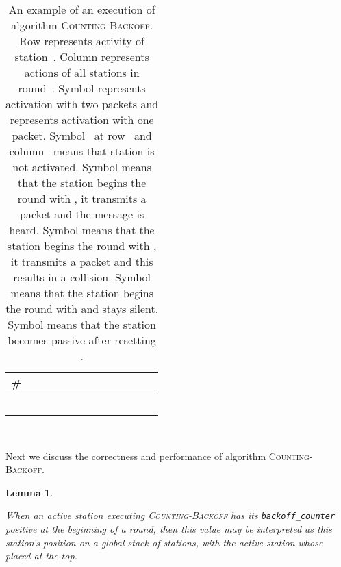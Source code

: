 \documentclass[11pt]{article}
\newlength{\pagewidth}
\newcommand{\RB}{\raisebox{2.5ex}{~}}
\newcommand{\LB}{\raisebox{-1.5ex}{~}}
\newtheorem{lemma}{Lemma}
\begin{document}
\begin{table}[t]
\begin{center}
\begin{tabular}{| c ||c |c |c |c |c | c | c | c | c | c | c | c | }
\hline
\RB \LB
\# &  &  &  &&&  & & &  &  &  &  \\
\hline\hline
\RB \LB
&   &  &  & & && & &  &&&\\
\hline
\RB \LB
 & &  &  && & & && &&&\\
\hline
\RB \LB
 & & & & & & &&& &&&\\
\hline
\RB \LB
 & & &&  & &&&& &&&\\
\hline
\RB \LB
 & & &&& &&&& &&&\\
\hline
\end{tabular}
\parbox{\pagewidth}{
~
\caption{\label{tab:first-example-counting-backoff}
An example of an execution of algorithm \textsc{Counting-Backoff}.
Row  represents activity of station~.
Column  represents actions of all stations in round~.
Symbol  represents activation with two packets and  represents activation with one packet.
Symbol~ at row~  and column~ means that station  is not activated.
Symbol  means that the station begins the round with , it  transmits a packet and the message is heard.
Symbol  means that the station begins the round with , it  transmits a packet and this results in a collision.
Symbol  means that the station begins the round with  and stays silent.
Symbol  means that the station becomes passive after resetting .
}}
\end{center}
\end{table}





Next we discuss the correctness and performance of algorithm  \textsc{Counting-Backoff}.



\begin{lemma}
\label{lem:stack}

When an active station executing \textsc{Counting-Backoff} has its \emph{\texttt{backoff\_counter}} positive at the beginning of a round, then this value may be interpreted as  this station's position on a global stack of stations, with the active station whose   placed at the top.
\end{lemma}
\end{document}
